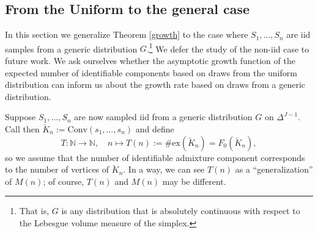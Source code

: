 \documentclass[12pt, reqno]{amsart}
\theoremstyle{definition}
\begin{document}
\subsection{From the Uniform to the general case}\label{from-to}
In this section we generalize Theorem \ref{growth} to the case where $S_1,\ldots,S_n$ are iid samples from a generic distribution $G$.\footnote{That is, $G$ is any distribution that is absolutely continuous with respect to the Lebesgue volume measure of the simplex.} We defer the study of the non-iid case to future work. We ask ourselves whether the asymptotic growth function of the expected number of identifiable components based on draws from the uniform distribution can inform us about the growth rate based on draws from a generic distribution. 

Suppose $S_1,\ldots,S_n$ are now sampled iid from a generic distribution $G$ on $\Delta^{J-1}$. Call then $\breve{K}_n:=\text{Conv}(s_1,\ldots,s_n)$ and define
$$T:\mathbb{N} \rightarrow \mathbb{N}, \quad n \mapsto T(n):=\#\text{ex}(\breve{K}_n)=F_0(\breve{K}_n),$$
so we assume that the number of identifiable admixture component corresponds to the number of vertices of $\breve{K}_n$. In a way, we can see $T(n)$ as a ``generalization'' of $M(n)$; of course, $T(n)$ and $M(n)$ may be different.








\end{document}
